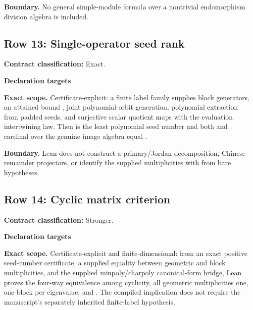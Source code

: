 \par\smallskip\noindent\textbf{Boundary.} No general simple-module formula over a nontrivial endomorphism division algebra is included.
\medskip
{}\subsection{Row 13: Single-operator seed rank}
\label{row:13}
\textbf{Contract classification:} Exact.
\par\smallskip\textbf{Declaration targets}\par
{\small\noindent{}\par}
{\small\noindent{}\par}
\medskip\noindent\textbf{Exact scope.} Certificate-explicit: a finite label family supplies block generators, an attained bound , joint polynomial-orbit generation, polynomial extraction from padded seeds, and surjective scalar quotient maps with the evaluation intertwining law. Then  is the least polynomial seed number and both  and cardinal  over the genuine image algebra  equal .
\par\smallskip\noindent\textbf{Boundary.} Lean does not construct a primary/Jordan decomposition, Chinese-remainder projectors, or identify the supplied multiplicities with  from bare hypotheses.
\medskip
{}\subsection{Row 14: Cyclic matrix criterion}
\label{row:14}
\textbf{Contract classification:} Stronger.
\par\smallskip\textbf{Declaration targets}\par
{\small\noindent{}\par}
{\small\noindent{}\par}
\medskip\noindent\textbf{Exact scope.} Certificate-explicit and finite-dimensional: from an exact positive seed-number certificate, a supplied equality between geometric and block multiplicities, and the supplied minpoly/charpoly canonical-form bridge, Lean proves the four-way equivalence among cyclicity, all geometric multiplicities one, one block per eigenvalue, and . The compiled implication does not require the manuscript's separately inherited finite-label hypothesis.
